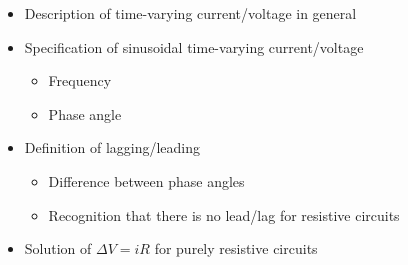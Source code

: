 \begin{itemize}
\item Description of time-varying current/voltage in general
\item Specification of sinusoidal time-varying current/voltage
  \begin{itemize}
  \item Frequency
  \item Phase angle
  \end{itemize}
\item Definition of lagging/leading
  \begin{itemize}
  \item Difference between phase angles
  \item Recognition that there is no lead/lag for resistive circuits
  \end{itemize}
\item Solution of $\Delta V=iR$ for purely resistive circuits
\end{itemize}
